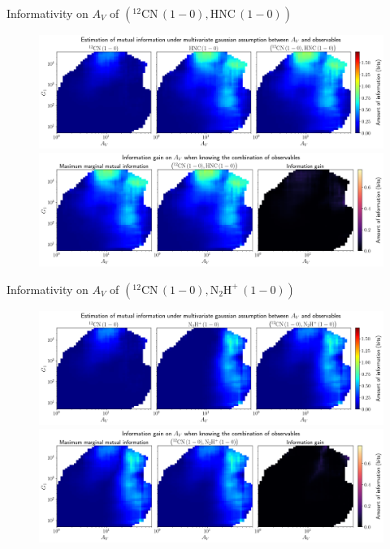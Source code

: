 \documentclass{beamer}
\begin{document}
\begin{frame}{Informativity on $A_V$ of $\left(\mathrm{^{12}CN\,(1-0)},\mathrm{HNC\,(1-0)}\right)$}
    \begin{figure}
        \centering
        \includegraphics[width=0.95\linewidth]{../linearinfogauss/av__12cn10_hnc10_linearinfogauss.png}
        \vfill
        \includegraphics[width=0.95\linewidth]{../linearinfogauss/av__12cn10_hnc10_linearinfogauss_gain.png}
    \end{figure}
\end{frame}

\begin{frame}{Informativity on $A_V$ of $\left(\mathrm{^{12}CN\,(1-0)},\mathrm{N_2H^+\,(1-0)}\right)$}
    \begin{figure}
        \centering
        \includegraphics[width=0.95\linewidth]{../linearinfogauss/av__12cn10_n2hp10_linearinfogauss.png}
        \vfill
        \includegraphics[width=0.95\linewidth]{../linearinfogauss/av__12cn10_n2hp10_linearinfogauss_gain.png}
    \end{figure}
\end{frame}
\end{document}
